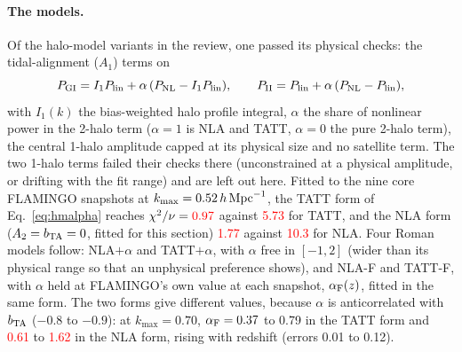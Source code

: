 \documentclass[11pt]{article}
\newcommand{\hMpc}{\,h\,{\rm Mpc}^{-1}}
\newcommand{\PNL}{P_{\rm NL}}
\newif\ifnumbersfinal
\newcommand{\refresh}[1]{\ifnumbersfinal#1\else\textcolor{red}{#1}\fi}
\newcommand{\HMflamTATTa}{\refresh{0.97}}
\newcommand{\HMflamTATT}{\refresh{5.73}}
\newcommand{\HMflamNLAa}{\refresh{1.77}}
\newcommand{\HMflamNLA}{\refresh{10.3}}
\newcommand{\HMaNLAlo}{\refresh{0.61}}
\newcommand{\HMaNLAhi}{\refresh{1.62}}
\begin{document}
\paragraph{The models.}
Of the halo-model variants in the review, one passed its physical checks:
the tidal-alignment ($A_1$) terms on
\begin{equation}
  P_{\rm GI} = I_1 P_{\rm lin} + \alpha\,(\PNL - I_1 P_{\rm lin}), \qquad
  P_{\rm II} = P_{\rm lin} + \alpha\,(\PNL - P_{\rm lin}),
  \label{eq:hmalpha}
\end{equation}
with $I_1(k)$ the bias-weighted halo profile integral, $\alpha$ the share of
nonlinear power in the 2-halo term ($\alpha = 1$ is NLA and TATT, $\alpha =
0$ the pure 2-halo term), the central 1-halo amplitude capped at its
physical size and no satellite term. The two 1-halo terms failed their
checks there (unconstrained at a physical amplitude, or drifting with the
fit range) and are left out here. Fitted to the nine core FLAMINGO
snapshots at $k_{\max} = 0.52\hMpc$, the TATT form of Eq.~\eqref{eq:hmalpha}
reaches $\chi^2/\nu = \HMflamTATTa$ against \HMflamTATT{} for TATT, and the
NLA form ($A_2 = b_{\rm TA} = 0$, fitted for this section)
\HMflamNLAa{} against \HMflamNLA{} for NLA. Four Roman models follow: NLA$+\alpha$
and TATT$+\alpha$, with $\alpha$ free in $[-1, 2]$ (wider than its physical
range so that an unphysical preference shows), and NLA-F and TATT-F, with
$\alpha$ held at FLAMINGO's own value at each snapshot, $\alpha_{\rm F}(z)$,
fitted in the same form. The two forms give different values, because
$\alpha$ is anticorrelated with $b_{\rm TA}$ ($-0.8$ to $-0.9$): at $k_{\max}
= 0.70$, $\alpha_{\rm F} = 0.37$ to 0.79 in the TATT form and \HMaNLAlo{}
to \HMaNLAhi{} in the NLA form, rising with redshift (errors 0.01 to 0.12).
\end{document}
